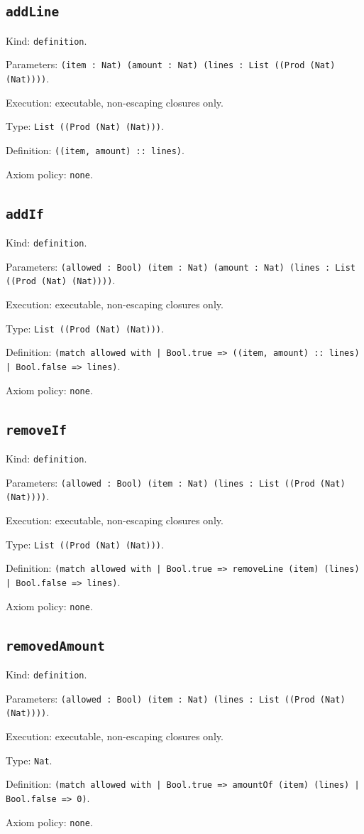 \documentclass[11pt]{article}
\begin{document}
\subsection*{\texttt{addLine}}
\noindent Kind: \texttt{definition}.\par
\noindent Parameters: \texttt{(item : Nat) (amount : Nat) (lines : List ((Prod (Nat) (Nat))))}.\par
\noindent Execution: executable, non-escaping closures only.\par
\noindent Type: \texttt{List ((Prod (Nat) (Nat)))}.\par
\noindent Definition: \texttt{((item, amount) :: lines)}.\par
\noindent Axiom policy: \texttt{none}.\par
\subsection*{\texttt{addIf}}
\noindent Kind: \texttt{definition}.\par
\noindent Parameters: \texttt{(allowed : Bool) (item : Nat) (amount : Nat) (lines : List ((Prod (Nat) (Nat))))}.\par
\noindent Execution: executable, non-escaping closures only.\par
\noindent Type: \texttt{List ((Prod (Nat) (Nat)))}.\par
\noindent Definition: \texttt{(match allowed with | Bool.true => ((item, amount) :: lines) | Bool.false => lines)}.\par
\noindent Axiom policy: \texttt{none}.\par
\subsection*{\texttt{removeIf}}
\noindent Kind: \texttt{definition}.\par
\noindent Parameters: \texttt{(allowed : Bool) (item : Nat) (lines : List ((Prod (Nat) (Nat))))}.\par
\noindent Execution: executable, non-escaping closures only.\par
\noindent Type: \texttt{List ((Prod (Nat) (Nat)))}.\par
\noindent Definition: \texttt{(match allowed with | Bool.true => removeLine (item) (lines) | Bool.false => lines)}.\par
\noindent Axiom policy: \texttt{none}.\par
\subsection*{\texttt{removedAmount}}
\noindent Kind: \texttt{definition}.\par
\noindent Parameters: \texttt{(allowed : Bool) (item : Nat) (lines : List ((Prod (Nat) (Nat))))}.\par
\noindent Execution: executable, non-escaping closures only.\par
\noindent Type: \texttt{Nat}.\par
\noindent Definition: \texttt{(match allowed with | Bool.true => amountOf (item) (lines) | Bool.false => 0)}.\par
\noindent Axiom policy: \texttt{none}.\par
\end{document}
